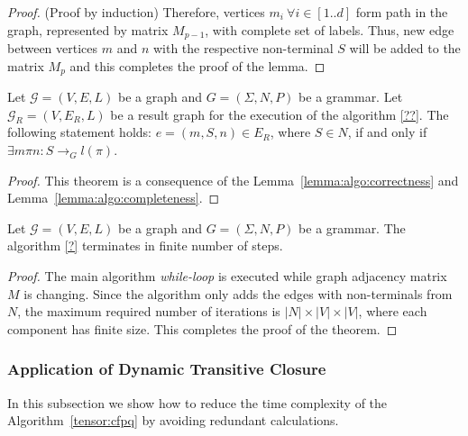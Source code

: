 \begin{proof}{(Proof by induction)}
    Therefore, vertices $m_i ~\forall i \in [1..d]$ form path in the graph, 
    represented by matrix $M_{p-1}$, with complete set of labels.
    Thus, new edge between vertices $m$ and $n$ with the respective 
    non-terminal $S$ will be added to the matrix $M_p$ and this completes 
    the proof of the lemma.

\end{proof}

\begin{theorem}
    Let $\mathcal{G} = (V,E,L)$ be a graph and  $G = (\Sigma, N, P)$ be a grammar.
    Let $\mathcal{G}_R = (V, E_R, L)$  be a result graph for the execution 
    of the algorithm \ref{??}. The following statement holds: 
    $e = (m, S, n) \in E_R$, where $S \in N$, if and only if 
    $\exists m \pi n: S \to_G l(\pi)$. 
\end{theorem}{}
    
\begin{proof}
    
    This theorem is a consequence of the  
    Lemma~\ref{lemma:algo:correctness} and 
    Lemma~\ref{lemma:algo:completeness}.
    
\end{proof}{}

\begin{theorem}{}
    Let $\mathcal{G} = (V,E,L)$ be a graph and $G = (\Sigma, N, P)$ be a grammar.
    The algorithm \ref{?} terminates in finite number of steps.
\end{theorem}

\begin{proof}
    
    The main algorithm \textit{while-loop} is executed while graph adjacency 
    matrix $M$ is changing. Since the algorithm only adds the edges with 
    non-terminals from $N$, the maximum required number of iterations 
    is $|N| \times |V| \times |V|$, where each component has finite size. 
    This completes the proof of the theorem.
    
\end{proof}{}


\subsubsection{Application of Dynamic Transitive Closure}

In this subsection we show how to reduce the time complexity of the Algorithm~\ref{tensor:cfpq} by avoiding redundant calculations. 


